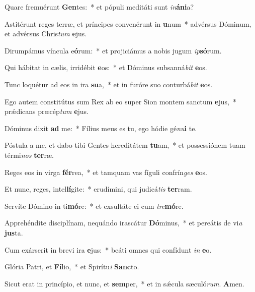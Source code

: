 \item Quare fremuérunt \textbf{Gen}tes:~* et pópuli meditáti sunt \textit{in}\textbf{á}\textbf{ni}a?
\item Astitérunt reges terræ, et príncipes convenérunt in \textbf{u}num~* advérsus Dóminum, et advérsus Chris\textit{tum} \textbf{e}jus.
\item Dirumpámus víncula e\textbf{ó}rum:~* et projiciámus a nobis jugum \textit{ip}\textbf{só}rum.
\item Qui hábitat in cælis, irridébit \textbf{e}os:~* et Dóminus subsanná\textit{bit} \textbf{e}os.
\item Tunc loquétur ad eos in ira \textbf{su}a,~* et in furóre suo conturbá\textit{bit} \textbf{e}os.
\item Ego autem constitútus sum Rex ab eo super Sion montem sanctum \textbf{e}jus,~* prǽdicans præcép\textit{tum} \textbf{e}jus.
\item Dóminus dixit \textbf{ad} me:~* Fílius meus es tu, ego hódie gé\textit{nu}\textbf{i} te.
\item Póstula a me, et dabo tibi Gentes hereditátem \textbf{tu}am,~* et possessiónem tuam térmi\textit{nos} \textbf{ter}ræ.
\item Reges eos in virga \textbf{fér}rea,~* et tamquam vas fíguli confrín\textit{ges} \textbf{e}os.
\item Et nunc, reges, intel\textbf{lí}gite:~* erudímini, qui judicá\textit{tis} \textbf{ter}ram.
\item Servíte Dómino in ti\textbf{mó}re:~* et exsultáte ei cum \textit{tre}\textbf{mó}re.
\item Apprehéndite disciplínam, nequándo irascátur \textbf{Dó}minus,~* et pereátis de vi\textit{a} \textbf{jus}ta.
\item Cum exárserit in brevi ira \textbf{e}jus:~* beáti omnes qui confídunt \textit{in} \textbf{e}o.
\item Glória Patri, et \textbf{Fí}lio,~* et Spirítu\textit{i} \textbf{Sanc}to.
\item Sicut erat in princípio, et nunc, et \textbf{sem}per,~* et in sǽcula sæculó\textit{rum}. \textbf{A}men.

